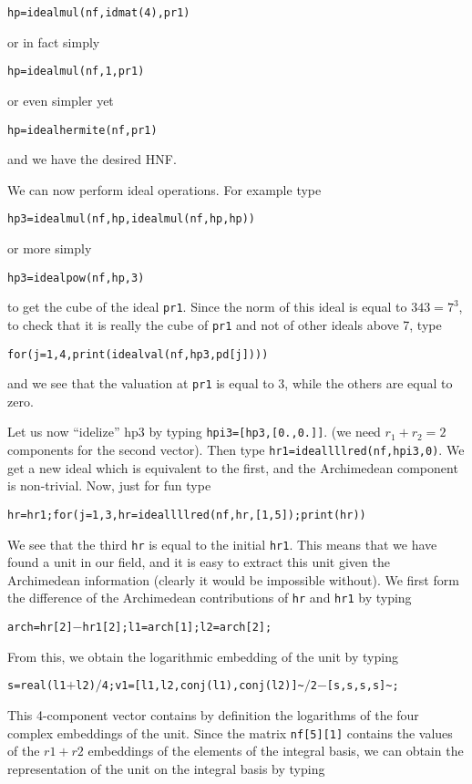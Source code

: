 \centerline{\tt hp=idealmul(nf,idmat(4),pr1)}

or in fact simply 

\centerline{\tt hp=idealmul(nf,1,pr1)}

or even simpler yet

\centerline{\tt hp=idealhermite(nf,pr1)}

and we have the desired HNF. 

We can now perform ideal operations. For example type

\centerline{\tt hp3=idealmul(nf,hp,idealmul(nf,hp,hp))}

or more simply

\centerline{\tt hp3=idealpow(nf,hp,3)}

to get the cube of the ideal {\tt pr1}.
Since the norm of this ideal is equal to $343=7^3$,
to check that it is really the cube of {\tt pr1} and not of other ideals
above 7, type

\centerline{\tt for(j=1,4,print(idealval(nf,hp3,pd[j])))}

and we see that the valuation at {\tt pr1} is equal to 3, while
the others are equal to zero.

Let us now ``idelize'' hp3 by typing {\tt hpi3=[hp3,[0.,0.]]}.
(we need $r_1+r_2=2$ components for the second vector).
Then type {\tt hr1=ideallllred(nf,hpi3,0)}. We get a new ideal which
is equivalent to the first, and the Archimedean component is
non-trivial. Now, just for fun type

\centerline{\tt hr=hr1;for(j=1,3,hr=ideallllred(nf,hr,[1,5]);print(hr))}

We see that the third {\tt hr} is equal to the initial {\tt hr1}. This
means that we have found a unit in our field, and it is easy to
extract this unit given the Archimedean information (clearly it
would be impossible without). We first form the difference of the
Archimedean contributions of {\tt hr} and {\tt hr1} by typing

\centerline{\tt arch=hr[2]$-$hr1[2];l1=arch[1];l2=arch[2];}

From this, we obtain the logarithmic embedding of the unit by typing

\centerline{\tt s=real(l1$+$l2)$/$4;v1=[l1,l2,conj(l1),conj(l2)]\~{}$/$2$-$[s,s,s,s]\~{};}

This 4-component vector contains by definition the logarithms of the
four complex embeddings of the unit. Since the matrix {\tt nf[5][1]}
contains the values of the $r1+r2$ embeddings of the elements of the
integral basis, we can obtain the representation of the unit on the
integral basis by typing

